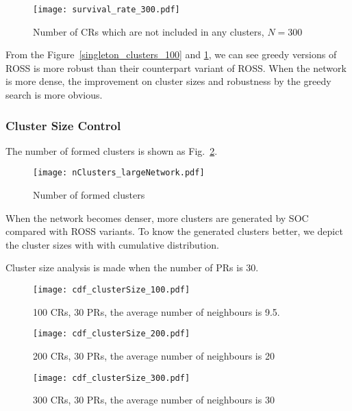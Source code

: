 \begin{figure}[h!]
  \centering
   \texttt{[image: survival\_rate\_300.pdf]}
  \caption{Number of CRs which are not included in any clusters, $N=300$}
  \label{singleton_clusters_300}
\end{figure}

From the Figure~\ref{singleton_clusters_100} and \ref{singleton_clusters_300}, we can see greedy versions of ROSS is more robust than their counterpart variant of ROSS.
When the network is more dense, the improvement on cluster sizes and robustness by the greedy search is more obvious.


\subsubsection*{Cluster Size Control}

The number of formed clusters is shown as Fig.~\ref{nClusters_largeNetwork}.

\begin{figure}[h!]
  \centering
   \texttt{[image: nClusters\_largeNetwork.pdf]}
  \caption{Number of formed clusters}
  \label{nClusters_largeNetwork}
\end{figure}
When the network becomes denser, more clusters are generated by SOC compared with ROSS variants.
To know the generated clusters better, we depict the cluster sizes with with cumulative distribution.

Cluster size analysis is made when the number of PRs is 30.


\begin{figure}[h!]
  \centering
   \texttt{[image: cdf\_clusterSize\_100.pdf]}
  \caption{100 CRs, 30 PRs, the average number of neighbours is 9.5.}
  \label{cdf_clusterSize_100}
\end{figure}

\begin{figure}[h!]
  \centering
   \texttt{[image: cdf\_clusterSize\_200.pdf]}
  \caption{200 CRs, 30 PRs, the average number of neighbours is 20}
  \label{cdf_clusterSize_200}
\end{figure}


\begin{figure}[h!]
  \centering
   \texttt{[image: cdf\_clusterSize\_300.pdf]}
  \caption{300 CRs, 30 PRs, the average number of neighbours is 30}
  \label{cdf_clusterSize_300}
\end{figure}

